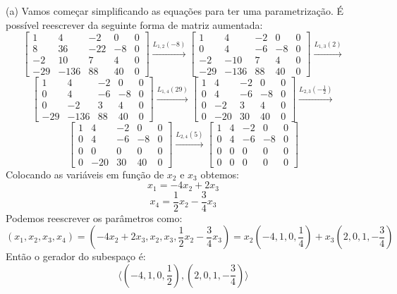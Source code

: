 \documentclass{homework}
\begin{document}
\exercise
(a) Vamos começar simplificando as equações para ter uma parametrização. É possível reescrever da seguinte forma de matriz aumentada:
\[
\left[ \begin{array}{cccc|c}
1 & 4 & -2 & 0 & 0\\
8 & 36 & -22 & -8 & 0\\
-2 & 10 & 7 & 4 & 0\\
-29 & -136 & 88 & 40 & 0
\end{array} \right] \xrightarrow{L_{1,2}(-8)}
\left[ \begin{array}{cccc|c}
1 & 4 & -2 & 0 & 0\\
0 & 4 & -6 & -8 & 0\\
-2 & -10 & 7 & 4 & 0\\
-29 & -136 & 88 & 40 & 0
\end{array} \right] \xrightarrow{L_{1,3}(2)}
\]
\[
\left[ \begin{array}{cccc|c}
1 & 4 & -2 & 0 & 0\\
0 & 4 & -6 & -8 & 0\\
0 & -2 & 3 & 4 & 0\\
-29 & -136 & 88 & 40 & 0
\end{array} \right] \xrightarrow{L_{1,4}(29)}
\left[ \begin{array}{cccc|c}
1 & 4 & -2 & 0 & 0\\
0 & 4 & -6 & -8 & 0\\
0 & -2 & 3 & 4 & 0\\
0 & -20 & 30 & 40 & 0
\end{array} \right] \xrightarrow{L_{2,3}(-\frac{1}{2})}
\]
\[
\left[ \begin{array}{cccc|c}
1 & 4 & -2 & 0 & 0\\
0 & 4 & -6 & -8 & 0\\
0 & 0 & 0 & 0 & 0\\
0 & -20 & 30 & 40 & 0
\end{array} \right] \xrightarrow{L_{2,4}(5)}
\left[ \begin{array}{cccc|c}
1 & 4 & -2 & 0 & 0\\
0 & 4 & -6 & -8 & 0\\
0 & 0 & 0 & 0 & 0\\
0 & 0 & 0 & 0 & 0
\end{array} \right]
\]
Colocando as variáveis em função de $x_2$ e $x_3$ obtemos:
\[x_1 = -4x_2 + 2x_3\]
\[x_4 = \frac{1}{2}x_2 - \frac{3}{4}x_3\]
Podemos reescrever os parâmetros como:
\[(x_1,x_2,x_3,x_4) = (-4x_2+2x_3,x_2,x_3,\frac{1}{2}x_2-\frac{3}{4}x_3) = x_2(-4,1,0,\frac{1}{4}) + x_3(2,0,1,-\frac{3}{4})\]
Então o gerador do subespaço é:
\[\langle(-4,1,0,\frac{1}{2}),(2,0,1,-\frac{3}{4})\rangle\]
\end{document}
